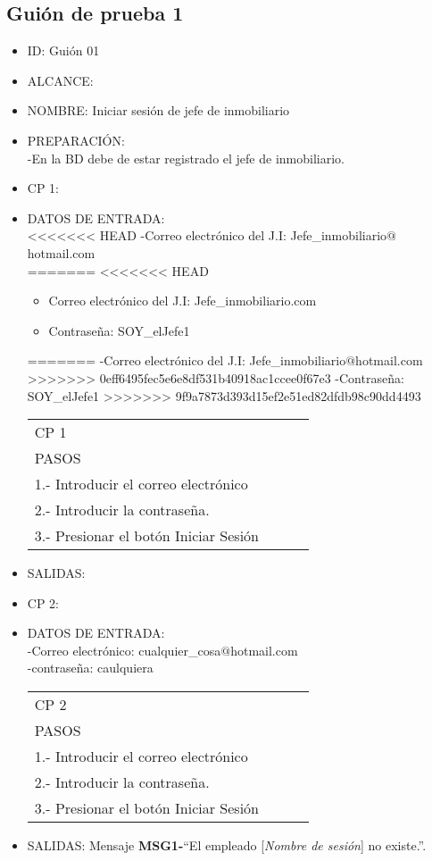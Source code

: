\subsection{Guión de prueba 1}
\begin{itemize}
\item ID: Guión 01
\item ALCANCE: 
\item NOMBRE: Iniciar sesión de jefe de inmobiliario  
\item PREPARACIÓN:\\
-En la BD debe de estar registrado el jefe de inmobiliario.
\item CP 1:
\item DATOS DE ENTRADA:\\
<<<<<<< HEAD
	-Correo electrónico del J.I: Jefe\_inmobiliario$@$hotmail.com\\
=======
<<<<<<< HEAD
	\begin{itemize}
		\item Correo electrónico del J.I: Jefe\_inmobiliario\@hotmail.com
		\item Contraseña: SOY\_elJefe1
	\end{itemize}
=======
	-Correo electrónico del J.I: Jefe\_inmobiliario$@$hotmail.com
>>>>>>> 0eff6495fec5e6e8df531b40918ac1ccee0f67e3
	-Contraseña: SOY\_elJefe1
>>>>>>> 9f9a7873d393d15ef2e51ed82dfdb98c90dd4493
\begin{center}			
	\begin{tabular}{|l|l|l|l|}
		\hline
		CP 1\\
		PASOS\\
		\hline 1.- Introducir el correo electrónico\\
		\hline 2.- Introducir la contraseña.\\
		\hline 3.- Presionar el botón Iniciar Sesión\\
		\hline
	\end{tabular}
\end{center}
\item SALIDAS: \label{CU1LoginJI}
\item CP 2:
\item DATOS DE ENTRADA:\\
	-Correo electrónico: cualquier\_cosa$@$hotmail.com\\
	-contraseña: caulquiera
\begin{center}			
	\begin{tabular}{|l|l|l|l|}
		\hline
		CP 2\\
		PASOS\\
		\hline 1.- Introducir el correo electrónico\\
		\hline 2.- Introducir la contraseña.\\
		\hline 3.- Presionar el botón Iniciar Sesión\\
		\hline
	\end{tabular}
\end{center}
\item SALIDAS: Mensaje {\bf MSG1-}``El empleado [{\em Nombre de sesión}] no existe.''.
  

\end{itemize}
